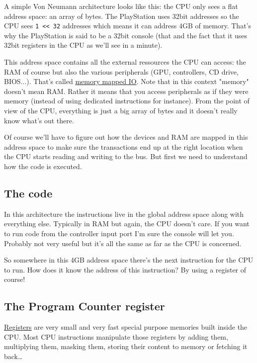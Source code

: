 \documentclass{article}
\begin{document}
A simple Von Neumann architecture looks like this: the CPU only sees a
flat address space: an array of bytes. The PlayStation uses 32bit
addresses so the CPU sees \texttt{1 << 32} addresses which means it
can address 4GB of memory. That's why the PlayStation is said to be a
32bit console (that and the fact that it uses 32bit registers in the
CPU as we'll see in a minute).

This address space contains all the external ressources the CPU can
access: the RAM of course but also the various peripherals (GPU,
controllers, CD drive, BIOS...). That's called
\href{https://en.wikipedia.org/wiki/Memory-mapped_I/O}{memory mapped
  IO}. Note that in this context "memory" doesn't mean RAM. Rather it
means that you access peripherals as if they were memory (instead of
using dedicated instructions for instance). From the point of view of
the CPU, everything is just a big array of bytes and it doesn't really
know what's out there.

Of course we'll have to figure out how the devices and RAM are mapped
in this address space to make sure the transactions end up at the
right location when the CPU starts reading and writing to the bus. But
first we need to understand how the code is executed.

\subsection{The code}

In this architecture the instructions live in the global address space
along with everything else. Typically in RAM but again, the CPU
doesn't care. If you want to run code from the controller input port
I'm sure the console will let you. Probably not very useful but it's
all the same as far as the CPU is concerned.

So somewhere in this 4GB address space there's the next instruction
for the CPU to run. How does it know the address of this instruction?
By using a register of course!

\subsection{The Program Counter register}

\href{https://en.wikipedia.org/wiki/Processor_register}{Registers} are
very small and very fast special purpose memories built inside the
CPU. Most CPU instructions manipulate those registers by adding them,
multiplying them, masking them, storing their content to memory or
fetching it back\ldots{}
\end{document}

